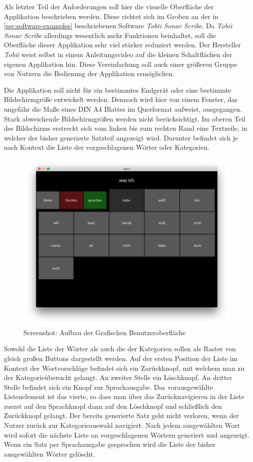         Als letzter Teil der Anforderungen soll hier die visuelle Oberfläche der Applikation beschrieben werden. Diese richtet sich im Groben an der in \autoref{sec:software-examples} beschriebenen Software \emph{Tobii Sonar Scribe}. Da \emph{Tobii Sonar Scribe} allerdings wesentlich mehr Funktionen beinhaltet, soll die Oberfläche dieser Applikation sehr viel stärker reduziert werden. Der Hersteller \emph{Tobii} weist selbst in einem Anleitungsvideo auf die kleinen Schaltflächen der eigenen Applikation hin. \parencite[min. 0:53]{tobii:sonoScribeVideo} Diese Vereinfachung soll auch einer größeren Gruppe von Nutzern die Bedienung der Applikation ermöglichen.
        
        Die Applikation soll nicht für ein bestimmtes Endgerät oder eine bestimmte Bildschirmgröße entwickelt werden. Dennoch wird hier von einem Fenster, das ungefähr die Maße eines DIN A4 Blattes im Querformat aufweist, ausgegangen. Stark abweichende Bildschirmgrößen werden nicht berücksichtigt. Im oberen Teil des Bildschirms erstreckt sich vom linken bis zum rechten Rand eine Textzeile, in welcher der bisher generierte Satzteil angezeigt wird. Darunter befindet sich je nach Kontext die Liste der vorgeschlagenen Wörter oder Kategorien.
        
		\begin{figure}[H]
    		\centering
    		\includegraphics[width=.6\linewidth]{images/UI-Model.png}
    		\caption[Aufbau der Grafischen Benutzeroberfläche]{Screenshot: Aufbau der Grafischen Benutzeroberfläche}
    		\label{img:GUIBase}
		\end{figure}
        
        Sowohl die Liste der Wörter als auch die der Kategorien sollen als Raster von gleich großen Buttons dargestellt werden. Auf der ersten Position der Liste im Kontext der Wortvorschläge befindet sich ein Zurückknopf, mit welchem man zu der Kategorieübersicht gelangt. An zweiter Stelle ein Löschknopf. An dritter Stelle befindet sich ein Knopf zur Sprachausgabe. Das vorausgewählte Listenelement ist das vierte, so dass  man über das Zurücknavigieren in der Liste zuerst auf den Sprachknopf dann auf den Löschknopf und schließlich den Zurückknopf gelangt. Der bereits generierte Satz geht nicht verloren, wenn der Nutzer zurück zur Kategorieauswahl navigiert. Nach jedem ausgewählten Wort wird sofort die nächste Liste an vorgeschlagenen Wörtern generiert und angezeigt. Wenn ein Satz per Sprachausgabe gesprochen wird die Liste der bisher ausgewählten Wörter gelöscht.
	\newpage
